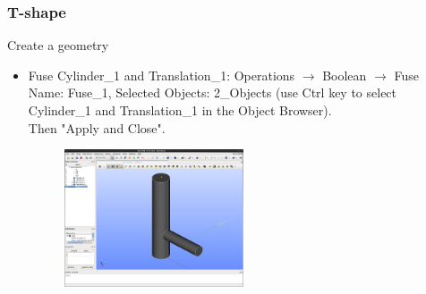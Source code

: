 \documentclass[10pt, hyperref={unicode=true,pdfusetitle, bookmarks=true,bookmarksnumbered=false,bookmarksopen=false, breaklinks=false,pdfborder={0 0 1},backref=true,colorlinks=true,linkcolor=darkblue,pageanchor}]{beamer}
\begin{document}
\begin{frame}
\frametitle{T-shape}
\begin{block}{Create a geometry}

\begin{itemize}
\item Fuse Cylinder\_1 and Translation\_1: Operations $\rightarrow$ Boolean $\rightarrow$ Fuse\\
Name: Fuse\_1, Selected Objects: 2\_Objects (use Ctrl key to select Cylinder\_1 and Translation\_1 in the Object Browser). \\
Then "Apply and Close".

\begin{figure}
\includegraphics[width=0.5\textwidth]{PICTURES/salome14.jpg}
\end{figure}

\end{itemize}

\end{block}
\end{frame}
\end{document}
